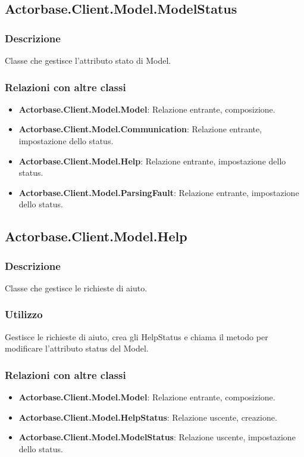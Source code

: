 \documentclass[a4paper]{article}
\begin{document}
		\subsection{Actorbase.Client.Model.ModelStatus}
			\subsubsection{Descrizione}
				Classe che gestisce l'attributo stato di Model.
			\subsubsection{Relazioni con altre classi}
				\begin{itemize}
					\item \textbf{Actorbase.Client.Model.Model}: Relazione entrante, composizione.
					\item \textbf{Actorbase.Client.Model.Communication}: Relazione entrante, impostazione dello status.
					\item \textbf{Actorbase.Client.Model.Help}: Relazione entrante, impostazione dello status.
					\item \textbf{Actorbase.Client.Model.ParsingFault}:	Relazione entrante, impostazione dello status.
				\end{itemize}
				
		\subsection{Actorbase.Client.Model.Help}
			\subsubsection{Descrizione}
				Classe che gestisce le richieste di aiuto.
			\subsubsection{Utilizzo}
				Gestisce le richieste di aiuto, crea gli HelpStatus e chiama il metodo per modificare l'attributo status del Model.
			\subsubsection{Relazioni con altre classi}
				\begin{itemize}
					\item \textbf{Actorbase.Client.Model.Model}: Relazione entrante, composizione.
					\item \textbf{Actorbase.Client.Model.HelpStatus}: Relazione uscente, creazione.
					\item \textbf{Actorbase.Client.Model.ModelStatus}: Relazione uscente, impostazione dello status.
				\end{itemize}
				
\end{document}

